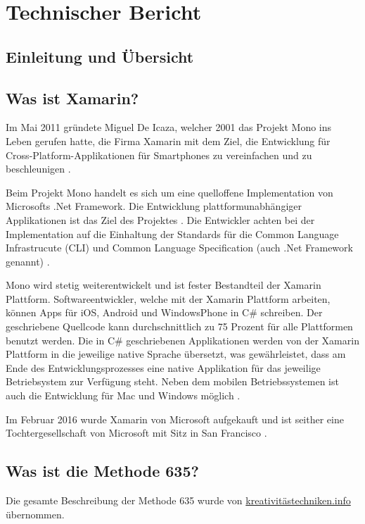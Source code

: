 \section{Technischer Bericht}

\subsection{Einleitung und Übersicht}

\subsection{Was ist Xamarin?}
Im Mai 2011 gründete Miguel De Icaza, welcher 2001 das Projekt Mono ins Leben gerufen hatte, die Firma Xamarin mit dem Ziel, die Entwicklung für Cross-Platform-Applikationen für Smartphones zu vereinfachen und zu beschleunigen \cite{XamarinWikipedia}.

Beim Projekt Mono handelt es sich um eine quelloffene Implementation von Microsofts .Net Framework. Die Entwicklung plattformunabhängiger Applikationen ist das Ziel des Projektes \cite{XamarinCCVossel}. Die Entwickler achten bei der Implementation auf die Einhaltung der Standards für die Common Language Infrastrucute (CLI) und Common Language Specification (auch .Net Framework genannt) \cite{XamarinQuora}.

Mono wird stetig weiterentwickelt und ist fester Bestandteil der Xamarin Plattform. Softwareentwickler, welche mit der Xamarin Plattform arbeiten, können Apps für iOS, Android und WindowsPhone in C\# schreiben. Der geschriebene Quellcode kann durchschnittlich zu 75 Prozent für alle Plattformen benutzt werden. Die in C\# geschriebenen Applikationen werden von der Xamarin Plattform in die jeweilige native Sprache übersetzt, was gewährleistet, dass am Ende des Entwicklungsprozesses eine native Applikation für das jeweilige Betriebsystem zur Verfügung steht. Neben dem mobilen Betriebssystemen ist auch die Entwicklung für Mac und Windows möglich \cite{XamarinCCVossel}.

Im Februar 2016 wurde Xamarin von Microsoft aufgekauft und ist seither eine Tochtergesellschaft von Microsoft mit Sitz in San Francisco \cite{XamarinWikipedia}.


\subsection{Was ist die Methode 635?} \label{subsec:methode_635_desc}
Die gesamte Beschreibung der Methode 635 wurde von \href{https://kreativitätstechniken.info/6-3-5-methode/}{kreativitästechniken.info} \cite{methode-635} übernommen. 


